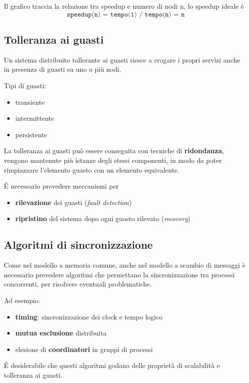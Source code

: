 Il grafico traccia la relazione tra speedup e numero di nodi n, lo speedup ideale è
\begin{equation*}
\texttt{speedup(n) = tempo(1) / tempo(n) = n}
\end{equation*}

\subsection{Tolleranza ai guasti}
Un sistema distribuito tollerante ai guasti riesce a erogare i propri servizi anche in presenza di guasti su uno o più nodi.

Tipi di guasti:
\begin{itemize}
    \item transiente
    \item intermittente
    \item persistente
\end{itemize}

La tolleranza ai guasti può essere conseguita con tecniche di \textbf{ridondanza}, vengono mantenute più istanze degli stessi componenti, in modo da poter rimpiazzare l'elemento guasto con un elemento equivalente.

É necessario prevedere meccanismi per
\begin{itemize}
    \item \textbf{rilevazione} dei guasti (\textit{fault detection})
    \item \textbf{ripristino} del sistema dopo ogni guasto rilevato (\textit{recovery})
\end{itemize}

\subsection{Algoritmi di sincronizzazione}
Come nel modello a memoria comune, anche nel modello a scambio di messaggi è necessario prevedere algoritmi che permettano la sincronizzazione tra processi concorrenti, per risolvere eventuali problematiche.

Ad esempio:
\begin{itemize}
    \item \textbf{timing}: sincronizzazione dei clock e tempo logico
    \item \textbf{mutua esclusione} distribuita
    \item elezione di \textbf{coordinatori} in gruppi di processi
\end{itemize}

É desiderabile che questi algoritmi godano delle proprietà di scalabilità e tolleranza ai guasti.

